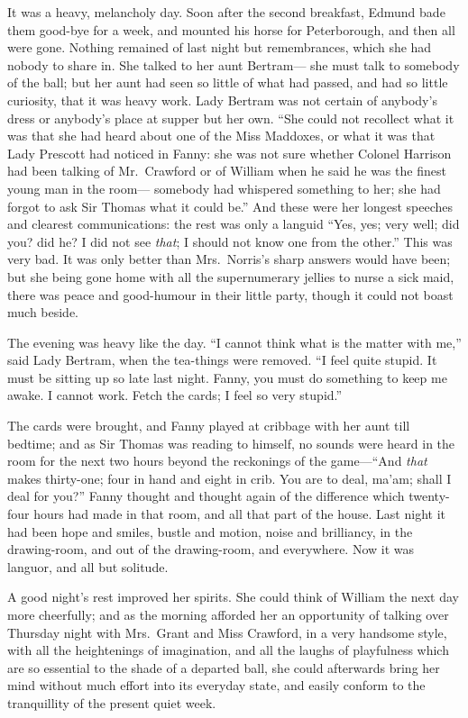 \documentclass{article}
\begin{document}
It was a heavy, melancholy day.  Soon after the second
breakfast, Edmund bade them good-bye for a week, and mounted
his horse for Peterborough, and then all were gone.
Nothing remained of last night but remembrances, which she
had nobody to share in.  She talked to her aunt Bertram---%
she must talk to somebody of the ball; but her aunt had seen
so little of what had passed, and had so little curiosity,
that it was heavy work.  Lady Bertram was not certain of
anybody's dress or anybody's place at supper but her own.
``She could not recollect what it was that she had heard
about one of the Miss Maddoxes, or what it was that Lady
Prescott had noticed in Fanny:  she was not sure whether
Colonel Harrison had been talking of Mr.\ Crawford or of
William when he said he was the finest young man in the room---%
somebody had whispered something to her; she had forgot
to ask Sir Thomas what it could be.''  And these were her
longest speeches and clearest communications:  the rest
was only a languid ``Yes, yes; very well; did you? did he?
I did not see \emph{that}; I should not know one from the other.''
This was very bad.  It was only better than Mrs.\ Norris's
sharp answers would have been; but she being gone home
with all the supernumerary jellies to nurse a sick maid,
there was peace and good-humour in their little party,
though it could not boast much beside.

The evening was heavy like the day.  ``I cannot think
what is the matter with me,'' said Lady Bertram,
when the tea-things were removed.  ``I feel quite stupid.
It must be sitting up so late last night.  Fanny, you must
do something to keep me awake.  I cannot work.
Fetch the cards; I feel so very stupid.''

The cards were brought, and Fanny played at cribbage
with her aunt till bedtime; and as Sir Thomas was reading
to himself, no sounds were heard in the room for the next
two hours beyond the reckonings of the game---``And \emph{that}
makes thirty-one; four in hand and eight in crib.
You are to deal, ma'am; shall I deal for you?''  Fanny thought
and thought again of the difference which twenty-four hours
had made in that room, and all that part of the house.
Last night it had been hope and smiles, bustle and motion,
noise and brilliancy, in the drawing-room, and out of
the drawing-room, and everywhere.  Now it was languor,
and all but solitude.

A good night's rest improved her spirits.  She could think
of William the next day more cheerfully; and as the morning
afforded her an opportunity of talking over Thursday night
with Mrs.\ Grant and Miss Crawford, in a very handsome style,
with all the heightenings of imagination, and all the
laughs of playfulness which are so essential to the shade
of a departed ball, she could afterwards bring her mind
without much effort into its everyday state, and easily
conform to the tranquillity of the present quiet week.
\end{document}
